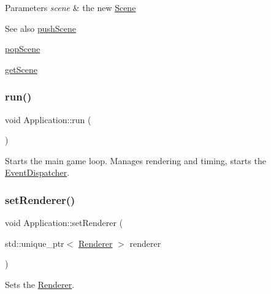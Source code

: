 \begin{DoxyParams}{Parameters}
{\em scene} & the new \mbox{\hyperlink{classsage_1_1Scene}{Scene}} \\
\hline
\end{DoxyParams}
\begin{DoxySeeAlso}{See also}
\mbox{\hyperlink{classsage_1_1Application_aa4644a106875cb18286b08131cb807d2}{push\+Scene}} 

\mbox{\hyperlink{classsage_1_1Application_a47b5bec61b3d93cbb4998b42d0d2ea47}{pop\+Scene}} 

\mbox{\hyperlink{classsage_1_1Application_a4d40d8fae7f9f26cf45d8fca6e811c3f}{get\+Scene}} 
\end{DoxySeeAlso}
\mbox{\label{classsage_1_1Application_a68965449404743bf1add056784d6cf81}} 
\subsubsection{\texorpdfstring{run()}{run()}}
{\footnotesize\ttfamily void Application\+::run (\begin{DoxyParamCaption}{ }\end{DoxyParamCaption})}



Starts the main game loop. Manages rendering and timing, starts the \mbox{\hyperlink{classsage_1_1EventDispatcher}{Event\+Dispatcher}}. 

\mbox{\label{classsage_1_1Application_a9b9d4014d4913a035e970a16bbc03199}} 
\subsubsection{\texorpdfstring{setRenderer()}{setRenderer()}}
{\footnotesize\ttfamily void Application\+::set\+Renderer (\begin{DoxyParamCaption}\item[{std\+::unique\+\_\+ptr$<$ \mbox{\hyperlink{classsage_1_1Renderer}{Renderer}} $>$}]{renderer }\end{DoxyParamCaption})}



Sets the \mbox{\hyperlink{classsage_1_1Renderer}{Renderer}}. 


